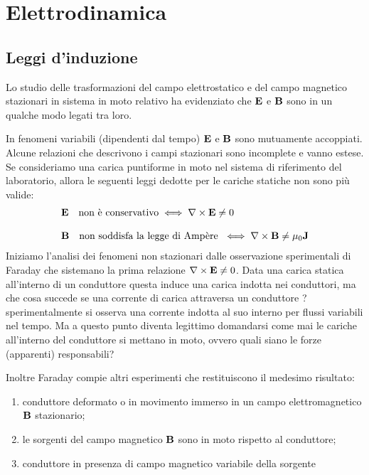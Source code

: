 \setcounter{chapter}{4}
\chapter{Elettrodinamica}

\section{Leggi d'induzione}

Lo studio delle trasformazioni del campo elettrostatico e del campo magnetico stazionari in sistema in moto relativo ha evidenziato che $\bold{E}$ e $\bold{B}$ sono in un qualche modo legati tra loro.

In fenomeni variabili (dipendenti dal tempo) $\bold{E}$ e $\bold{B}$ sono mutuamente accoppiati. Alcune relazioni che descrivono i campi stazionari sono incomplete e vanno estese.
Se consideriamo una carica puntiforme in moto nel sistema di riferimento del laboratorio, allora le seguenti leggi dedotte per le cariche statiche non sono pi\`u valide:
\begin{align*}
	& \bold{E} \quad \text{non \`e conservativo} \iff \nabla \times \bold{E} \neq 0 \\[0.3cm]
	& \bold{B} \quad \text{non soddisfa la legge di Amp\`ere } \iff \nabla \times \bold{B} \neq \mu_0 \bold{J}
\end{align*}
Iniziamo l'analisi dei fenomeni non stazionari dalle osservazione sperimentali di Faraday che sistemano la prima relazione $\nabla \times \bold{E} \neq 0$.  Data una carica statica all'interno di un conduttore 
questa induce una carica indotta nei conduttori, ma che cosa succede se una corrente di carica attraversa un conduttore ? sperimentalmente si osserva una corrente indotta al suo interno per flussi variabili nel tempo. Ma a questo punto diventa 
legittimo domandarsi come mai le cariche all'interno del conduttore si mettano in moto, ovvero quali siano le forze (apparenti) responsabili?

Inoltre Faraday compie altri esperimenti che restituiscono il medesimo risultato:
\begin{enumerate}
	\item conduttore deformato o in movimento immerso in un campo elettromagnetico $\bold{B}$ stazionario;
	\item le sorgenti del campo magnetico $\bold{B}$ sono in moto rispetto al conduttore;
	\item conduttore in presenza di campo magnetico variabile della sorgente
\end{enumerate}

